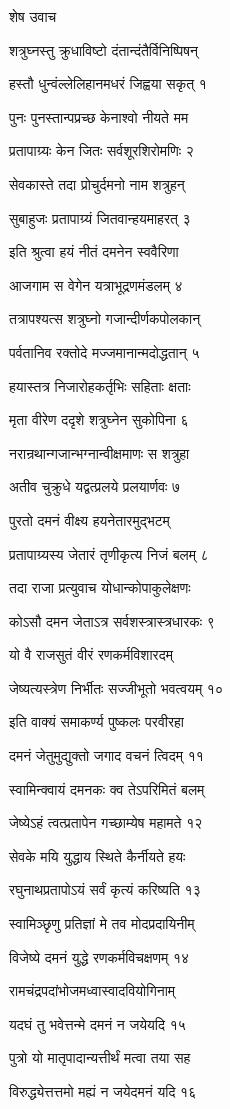 शेष उवाच

शत्रुघ्नस्तु क्रुधाविष्टो दंतान्दंतैर्विनिष्पिषन्

हस्तौ धुन्वंल्लेलिहानमधरं जिह्वया सकृत् १

पुनः पुनस्तान्पप्रच्छ केनाश्वो नीयते मम

प्रतापाग्र्यः केन जितः सर्वशूरशिरोमणिः २

सेवकास्ते तदा प्रोचुर्दमनो नाम शत्रुहन्

सुबाहुजः प्रतापाग्र्यं जितवान्हयमाहरत् ३

इति श्रुत्वा हयं नीतं दमनेन स्ववैरिणा

आजगाम स वेगेन यत्राभूद्रणमंडलम् ४

तत्रापश्यत्स शत्रुघ्नो गजान्दीर्णकपोलकान्

पर्वतानिव रक्तोदे मज्जमानान्मदोद्धतान् ५

हयास्तत्र निजारोहकर्तृभिः सहिताः क्षताः

मृता वीरेण ददृशे शत्रुघ्नेन सुकोपिना ६

नरान्रथान्गजान्भग्नान्वीक्षमाणः स शत्रुहा

अतीव चुक्रुधे यद्वत्प्रलये प्रलयार्णवः ७

पुरतो दमनं वीक्ष्य हयनेतारमुद्भटम्

प्रतापाग्र्यस्य जेतारं तृणीकृत्य निजं बलम् ८

तदा राजा प्रत्युवाच योधान्कोपाकुलेक्षणः

कोऽसौ दमन जेताऽत्र सर्वशस्त्रास्त्रधारकः ९

यो वै राजसुतं वीरं रणकर्मविशारदम्

जेष्यत्यस्त्रेण निर्भीतः सज्जीभूतो भवत्वयम् १०

इति वाक्यं समाकर्ण्य पुष्कलः परवीरहा

दमनं जेतुमुद्युक्तो जगाद वचनं त्विदम् ११

स्वामिन्क्वायं दमनकः क्व तेऽपरिमितं बलम्

जेष्येऽहं त्वत्प्रतापेन गच्छाम्येष महामते १२

सेवके मयि युद्धाय स्थिते कैर्नीयते हयः

रघुनाथप्रतापोऽयं सर्वं कृत्यं करिष्यति १३

स्वामिञ्छृणु प्रतिज्ञां मे तव मोदप्रदायिनीम्

विजेष्ये दमनं युद्धे रणकर्मविचक्षणम् १४

रामचंद्रपदांभोजमध्वास्वादवियोगिनाम्

यदघं तु भवेत्तन्मे दमनं न जयेयदि १५

पुत्रो यो मातृपादान्यत्तीर्थं मत्वा तया सह

विरुद्ध्येत्तत्तमो मह्यं न जयेदमनं यदि १६

